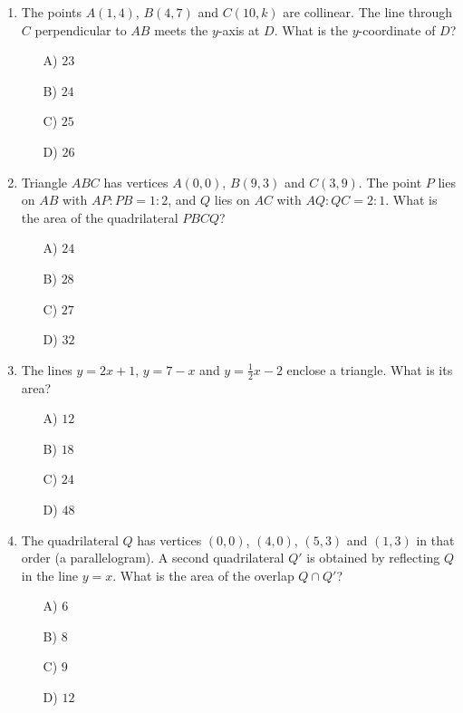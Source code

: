 \documentclass[11pt,a4paper]{article}
\begin{document}
\begin{enumerate}
\item The points $A(1,4)$, $B(4,7)$ and $C(10,k)$ are collinear. The line through $C$ perpendicular to $AB$ meets the $y$-axis at $D$. What is the $y$-coordinate of $D$?
\begin{itemize}
\item[A)] $23$
\item[B)] $24$
\item[C)] $25$
\item[D)] $26$
\end{itemize}

\item Triangle $ABC$ has vertices $A(0,0)$, $B(9,3)$ and $C(3,9)$. The point $P$ lies on $AB$ with $AP:PB=1:2$, and $Q$ lies on $AC$ with $AQ:QC=2:1$. What is the area of the quadrilateral $PBCQ$?
\begin{itemize}
\item[A)] $24$
\item[B)] $28$
\item[C)] $27$
\item[D)] $32$
\end{itemize}

\item The lines $y=2x+1$, $y=7-x$ and $y=\tfrac12x-2$ enclose a triangle. What is its area?
\begin{itemize}
\item[A)] $12$
\item[B)] $18$
\item[C)] $24$
\item[D)] $48$
\end{itemize}

\item \begin{minipage}[t]{0.68\linewidth}
The quadrilateral $Q$ has vertices $(0,0)$, $(4,0)$, $(5,3)$ and $(1,3)$ in that order (a parallelogram). A second quadrilateral $Q'$ is obtained by reflecting $Q$ in the line $y=x$. What is the area of the overlap $Q\cap Q'$?
\begin{itemize}
\item[A)] $6$
\item[B)] $8$
\item[C)] $9$
\item[D)] $12$
\end{itemize}
\end{minipage}\hfill
\begin{minipage}[t]{0.28\linewidth}
\vspace{0pt}
\centering
{}
\end{minipage}

\end{enumerate}
\end{document}
